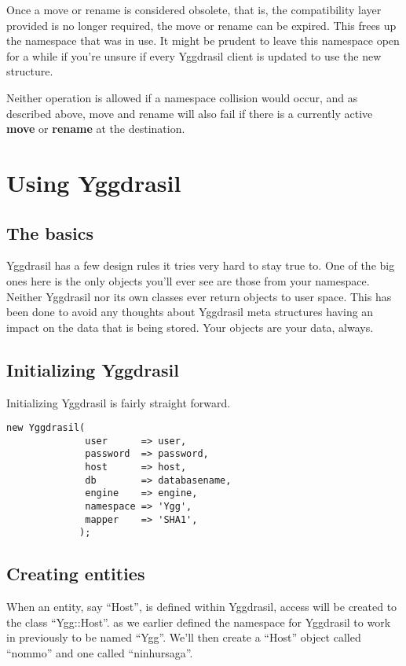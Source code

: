 \documentclass[english,a4paper]{article}
\begin{document}
Once a move or rename is considered obsolete, that is, the
compatibility layer provided is no longer required, the move or rename
can be expired.  This frees up the namespace that was in use.  It
might be prudent to leave this namespace open for a while if you're
unsure if every Yggdrasil client is updated to use the new structure.

Neither operation is allowed if a namespace collision would occur, and
as described above, move and rename will also fail if there is a
currently active \textbf{move} or \textbf{rename} at the destination.

\newpage
\section{Using Yggdrasil}

\subsection{The basics}

Yggdrasil has a few design rules it tries very hard to stay true to.
One of the big ones here is the only objects you'll ever see are those
from your namespace.  Neither Yggdrasil nor its own classes ever
return objects to user space.  This has been done to avoid any
thoughts about Yggdrasil meta structures having an impact on the data
that is being stored.  Your objects are your data, always.

\subsection{Initializing Yggdrasil}

Initializing Yggdrasil is fairly straight forward.

\lstset{caption=Initializing Yggrasil,label=ygginit,float=tp,aboveskip=0.7cm}
\begin{lstlisting}
new Yggdrasil(
              user      => user,
              password  => password,
              host      => host,
              db        => databasename,
              engine    => engine,
              namespace => 'Ygg',
              mapper    => 'SHA1',
             );
\end{lstlisting}

\subsection{Creating entities}

When an entity, say ``Host'', is defined within Yggdrasil, access will
be created to the class ``Ygg::Host''.  as we earlier defined the
namespace for Yggdrasil to work in previously to be named ``Ygg''.
We'll then create a ``Host'' object called ``nommo'' and one called
``ninhursaga''.
\end{document}
